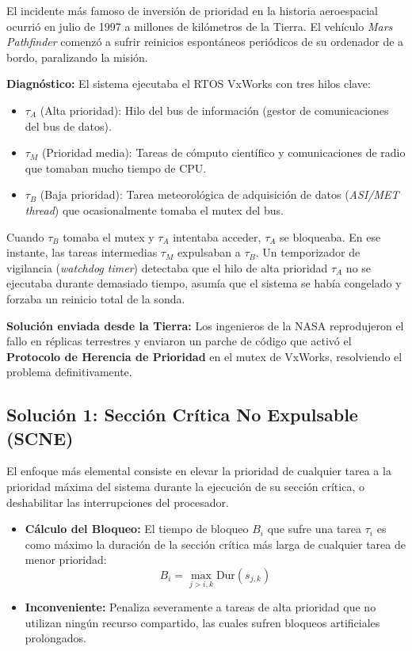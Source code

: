 \begin{ejemplo}
El incidente más famoso de inversión de prioridad en la historia aeroespacial ocurrió en julio de 1997 a millones de kilómetros de la Tierra. El vehículo \textit{Mars Pathfinder} comenzó a sufrir reinicios espontáneos periódicos de su ordenador de a bordo, paralizando la misión.

\textbf{Diagnóstico:} El sistema ejecutaba el RTOS VxWorks con tres hilos clave:
\begin{itemize}
    \item $\tau_A$ (Alta prioridad): Hilo del bus de información (gestor de comunicaciones del bus de datos).
    \item $\tau_M$ (Prioridad media): Tareas de cómputo científico y comunicaciones de radio que tomaban mucho tiempo de CPU.
    \item $\tau_B$ (Baja prioridad): Tarea meteorológica de adquisición de datos (\textit{ASI/MET thread}) que ocasionalmente tomaba el mutex del bus.
\end{itemize}
Cuando $\tau_B$ tomaba el mutex y $\tau_A$ intentaba acceder, $\tau_A$ se bloqueaba. En ese instante, las tareas intermedias $\tau_M$ expulsaban a $\tau_B$. Un temporizador de vigilancia (\textit{watchdog timer}) detectaba que el hilo de alta prioridad $\tau_A$ no se ejecutaba durante demasiado tiempo, asumía que el sistema se había congelado y forzaba un reinicio total de la sonda.

\textbf{Solución enviada desde la Tierra:} Los ingenieros de la NASA reprodujeron el fallo en réplicas terrestres y enviaron un parche de código que activó el \textbf{Protocolo de Herencia de Prioridad} en el mutex de VxWorks, resolviendo el problema definitivamente.
\end{ejemplo}

\subsection{Solución 1: Sección Crítica No Expulsable (SCNE)}
El enfoque más elemental consiste en elevar la prioridad de cualquier tarea a la prioridad máxima del sistema durante la ejecución de su sección crítica, o deshabilitar las interrupciones del procesador.
\begin{itemize}[leftmargin=*]
    \item \textbf{Cálculo del Bloqueo:} El tiempo de bloqueo $B_i$ que sufre una tarea $\tau_i$ es como máximo la duración de la sección crítica más larga de cualquier tarea de menor prioridad:
    \begin{equation}
    B_i = \max_{j > i, k} \text{Dur}(s_{j,k})
    \end{equation}
    \item \textbf{Inconveniente:} Penaliza severamente a tareas de alta prioridad que no utilizan ningún recurso compartido, las cuales sufren bloqueos artificiales prolongados.
\end{itemize}

